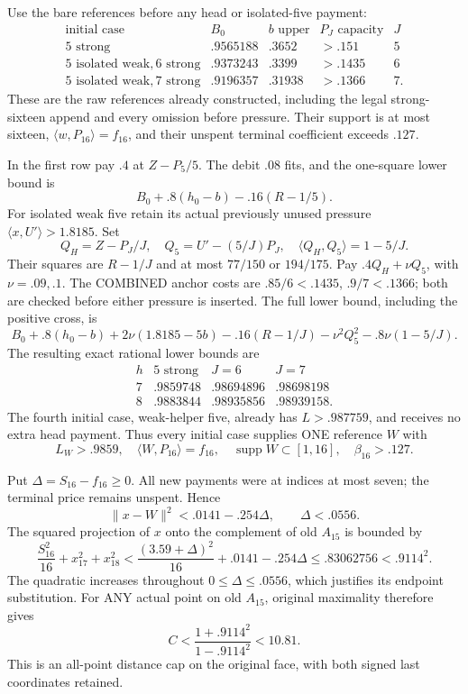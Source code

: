 \documentclass[11pt]{article}
\theoremstyle{definition}
\theoremstyle{remark}
\newcommand{\ip}[2]{\langle #1,#2\rangle}
\newcommand{\norm}[1]{\lVert #1\rVert}
\begin{document}
Use the bare references before any head or isolated-five payment:
\[
\begin{array}{c|c|c|c|c}
\text{initial case}&B_0&b\text{ upper}&P_J\text{ capacity}&J\\ \hline
5\text{ strong}&.9565188&.3652&>.151&5\\
5\text{ isolated weak},6\text{ strong}&.9373243&.3399&>.1435&6\\
5\text{ isolated weak},7\text{ strong}&.9196357&.31938&>.1366&7 .
\end{array}
\]
These are the raw references already constructed, including the
legal strong-sixteen append and every omission before pressure.
Their support is at most sixteen,
\(\ip w{P_{16}}=f_{16}\), and their unspent terminal coefficient
exceeds \(.127\).

In the first row pay \(.4\) at \(Z-P_5/5\).
The debit \(.08\) fits, and the one-square lower bound is
\[
 B_0+.8(h_0-b)-.16(R-1/5).
\]
For isolated weak five retain its actual previously unused pressure
\(\ip x{U'}>1.8185\).
Set
\[
 Q_H=Z-P_J/J,\quad Q_5=U'-(5/J)P_J,\quad
 \ip{Q_H}{Q_5}=1-5/J .
\]
Their squares are \(R-1/J\) and at most
\(77/150\) or \(194/175\).
Pay \(.4Q_H+\nu Q_5\), with \(\nu=.09,.1\).
The COMBINED anchor costs are
\(.85/6<.1435\), \(.9/7<.1366\);
both are checked before either pressure is inserted.
The full lower bound, including the positive cross, is
\[
 B_0+.8(h_0-b)+2\nu(1.8185-5b)
 -.16(R-1/J)-\nu^2Q_5^2-.8\nu(1-5/J).
\]
The resulting exact rational lower bounds are
\[
 \begin{array}{c|ccc}
 h&5\text{ strong}&J=6&J=7\\ \hline
 7&.9859748&.98694896&.98698198\\
 8&.9883844&.98935856&.98939158 .
 \end{array}
\]
The fourth initial case, weak-helper five, already has
\(L>.987759\), and receives no extra head payment.
Thus every initial case supplies ONE reference \(W\) with
\[
 L_W>.9859,\quad
 \ip W{P_{16}}=f_{16},\quad
 \operatorname{supp}W\subset[1,16],\quad \beta_{16}>.127.
\]

Put \(\Delta=S_{16}-f_{16}\ge0\).
All new payments were at indices at most seven; the terminal
price remains unspent.  Hence
\[
 \norm{x-W}^2<.0141-.254\Delta,\qquad
 \Delta<.0556 .
\]
The squared projection of \(x\) onto the complement of old \(A_{15}\)
is bounded by
\[
 {\frac{S_{16}^2}{16}}+x_{17}^2+x_{18}^2
 <{\frac{(3.59+\Delta)^2}{16}}+.0141-.254\Delta
 \le .83062756<.9114^2 .
\]
The quadratic increases throughout \(0\le\Delta\le.0556\),
which justifies its endpoint substitution.
For ANY actual point on old \(A_{15}\), original maximality
therefore gives
\[
              C<{\frac{1+.9114^2}{1-.9114^2}}<10.81 .
\tag{DFiniteface}\label{eq:DFiniteface}
\]
This is an all-point distance cap on the original face, with both
signed last coordinates retained.
\end{document}
